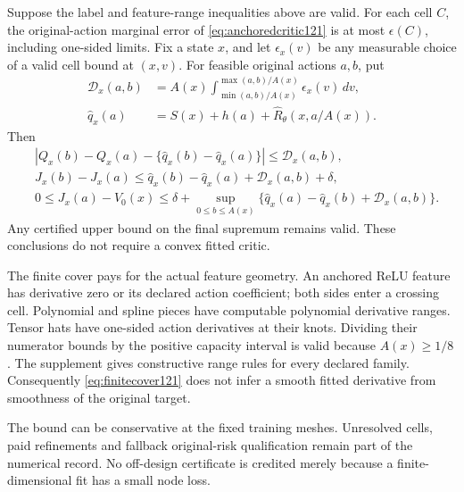 \begin{theorem}
\label{thm:quotientlearning121}
Suppose the label and feature-range inequalities above are valid.
For each cell \(C\), the original-action marginal error of
\eqref{eq:anchoredcritic121} is at most \(\epsilon(C)\), including
one-sided limits.  Fix a state \(x\), and let
\(\epsilon_x(v)\) be any measurable choice of a valid cell bound
at \((x,v)\).  For feasible original actions \(a,b\), put
\begin{align}
 \mathcal D_x(a,b)
   &=A(x)\int_{\min(a,b)/A(x)}^{\max(a,b)/A(x)}
                          \epsilon_x(v)\,dv,\nonumber\\
 \widehat q_x(a)&=S(x)+h(a)+
        \widehat R_\theta(x,a/A(x)).\label{eq:pathcertificate121}
\end{align}
Then
\begin{align}
 &\left|Q_x(b)-Q_x(a)
          -\{\widehat q_x(b)-\widehat q_x(a)\}\right|
       \leq\mathcal D_x(a,b),\label{eq:quotientcontrast121}\\
 &J_x(b)-J_x(a)\leq
       \widehat q_x(b)-\widehat q_x(a)+\mathcal D_x(a,b)+\delta,
       \nonumber\\
 &0\leq J_x(a)-V_0(x)\leq \delta+
       \sup_{0\leq b\leq A(x)}
       \{\widehat q_x(a)-\widehat q_x(b)+\mathcal D_x(a,b)\}.
       \label{eq:learnedallaction121}
\end{align}
Any certified upper bound on the final supremum remains valid.
These conclusions do not require a convex fitted critic.
\end{theorem}

The finite cover pays for the actual feature geometry.  An anchored
ReLU feature has derivative zero or its declared action coefficient;
both sides enter a crossing cell.  Polynomial and spline pieces
have computable polynomial derivative ranges.  Tensor hats have
one-sided action derivatives at their knots.  Dividing their
numerator bounds by the positive capacity interval is valid because
\(A(x)\geq1/8\).  The supplement gives constructive range rules
for every declared family.  Consequently
\eqref{eq:finitecover121} does not infer a smooth fitted derivative
from smoothness of the original target.

The bound can be conservative at the fixed training meshes.
Unresolved cells, paid refinements and fallback original-risk
qualification remain part of the numerical record.  No off-design
certificate is credited merely because a finite-dimensional fit
has a small node loss.

